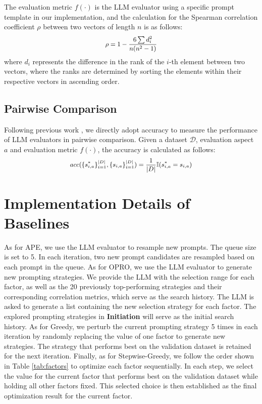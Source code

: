 The evaluation metric $f(\cdot)$ is the LLM evaluator using a specific prompt template in our implementation, and the calculation for the Spearman correlation coefficient $\rho$ between two vectors of length $n$ is as follows:
\begin{equation}
\small
\begin{aligned}
\rho = 1 - \frac{6 \sum d_i^2}{n(n^2 - 1)}
\end{aligned}
\end{equation}
where $d_i$ represents the difference in the rank of the $i$-th element between two vectors, where the ranks are determined by sorting the elements within their respective vectors in ascending order.

\subsection{Pairwise Comparison}
Following previous work \cite{zeng2024llmbar, lambert2024rewardbench}, we directly adopt accuracy to measure the performance of LLM evaluators in pairwise comparison. Given a dataset $\mathcal{D}$, evaluation aspect $a$ and evaluation metric $f(\cdot)$, the accuracy is calculated as follows:
\begin{equation}
\small
\begin{aligned}
acc(\{s^*_{i,a}\}_{i=1}^{|D|}, \{s_{i,a}\}_{i=1}^{|D|}) = 
\frac{1}{|D|}\mathbb{I}(s^*_{i,a}=s_{i,a}) 
\end{aligned}
\end{equation}


\section{Implementation Details of Baselines}
\label{appendix:baselines}
As for APE, we use the LLM evaluator to resample new prompts. 
The queue size is set to 5. 
In each iteration, two new prompt candidates are resampled based on each prompt in the queue. 
As for OPRO, we use the LLM evaluator to generate new prompting strategies.
We provide the LLM with the selection range for each factor, as well as the 20 previously top-performing strategies and their corresponding correlation metrics, which serve as the search history.  
The LLM is asked to generate a list containing the new selection strategy for each factor. 
The explored prompting strategies in \textbf{Initiation} will serve as the initial search history. 
As for Greedy, we perturb the current prompting strategy 5 times in each iteration by randomly replacing the value of one factor to generate new strategies. 
The strategy that performs best on the validation dataset is retained for the next iteration.
Finally, as for Stepwise-Greedy, we follow the order shown in Table \ref{tab:factors} to optimize each factor sequentially. 
In each step, we select the value for the current factor that performs best on the validation dataset while holding all other factors fixed.
This selected choice is then established as the final optimization result for the current factor.



